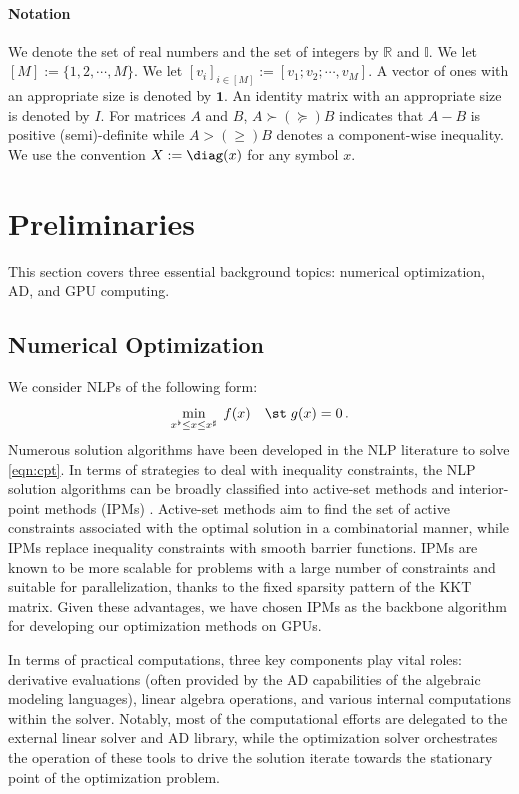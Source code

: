 \paragraph*{Notation}
We denote the set of real numbers and the set of integers by
$\mathbb{R}$ and $\mathbb{I}$. We let $[M]:=\{1,2,\cdots,M\}$. We let
$[v_i]_{i\in[M]}:=[v_1;v_2;\cdots,v_M]$.  A vector of ones with an
appropriate size is denoted by $\boldsymbol{1}$. An identity matrix
with an appropriate size is denoted by $I$. For matrices $A$ and $B$,
$A\succ(\succeq) B$ indicates that $A-B$ is positive (semi)-definite
while $A>(\geq) B$ denotes a component-wise inequality. We use the
convention $X:=\diag(x)$ for any symbol $x$.

\section{Preliminaries}\label{sec:prelim}
This section covers three essential background topics: numerical
optimization, AD, and GPU computing.

\subsection{Numerical Optimization}\label{sec:numopt}
We consider NLPs of the following form:
\begin{equation}\label{eqn:cpt}
    \min_{x^\flat \leq x \leq x^\sharp}\;  f(x) \quad \st\;
     g(x) =0 \, .
\end{equation}
Numerous solution algorithms have been developed in the NLP
literature to solve \eqref{eqn:cpt}. In terms of strategies to deal with inequality
constraints, the NLP solution algorithms can be broadly classified
into active-set methods and interior-point methods (IPMs) \cite{nocedal2006numerical}.
Active-set methods aim to find the set of active constraints associated
with the optimal solution in a combinatorial manner, while IPMs
replace inequality constraints with smooth barrier functions.
IPMs are known to be
more scalable for problems with a large number of constraints and
suitable for parallelization, thanks to the fixed sparsity pattern of
the KKT matrix. Given these advantages, we have chosen IPMs as the
backbone algorithm for developing our optimization methods on GPUs.

In terms of practical computations, three key components play
vital roles: derivative evaluations (often provided by the AD
capabilities of the algebraic modeling languages), linear algebra
operations, and various internal computations within the
solver. Notably, most of the computational efforts are delegated to
the external linear solver and AD library, while the optimization solver
orchestrates the operation of these tools to drive the solution
iterate towards the stationary point of the optimization problem.

